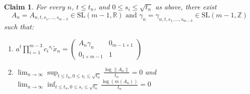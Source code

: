 \documentclass[10pt,reqno]{amsart}
\theoremstyle{Theorem}
\newtheorem{claim}[theorem]{Claim}
\theoremstyle{definition}
\theoremstyle{remark}
\newcommand{\td}{\tilde}
\newcommand{\R}{\mathbb {R}}
\newcommand{\Z}{\mathbb {Z}}
\newcommand{\Sl}{\mathrm{SL}}
\def\red{\color{red}}
\begin{document}

%

%




\begin{claim} For every $n$,  $t\le t_n$, and $ 0\le s_i\le \sqrt{t_n}$ as above, there exist $$\text{$A_{n}= A_{n,t,s_1, \dots , s_{m-3}} \in \Sl(m-1, \R)$ and $\gamma_{n} = \gamma_{n,t,s_1, \dots , s_{m-3}} \in \Sl(m-1,\Z)$}$$ such that:

\begin{enumerate}\label{An}

\item $ \displaystyle a^t \prod_{i=1}^{m-3}{c_i}^{s_i} \td x_n =
\begin{pmatrix}
  A_n\gamma_n & 0_{m-1 \times 1} \\ 0_{1\times m-1} & 1
\end{pmatrix}
$

\item $ \displaystyle\lim_{n\to \infty} \sup_{t\le t_n,   0\le s_i\le \sqrt{t_n}}  \frac{\log\|A_n\|}{t_n} = 0 $ and  $ \displaystyle\lim_{n\to \infty} \inf_{t\le t_n,   0\le s_i\le \sqrt{t_n}}  \frac{\log(m(A_n))}{t_n} = 0 $


\end{enumerate}

\end{claim}
\end{document}
